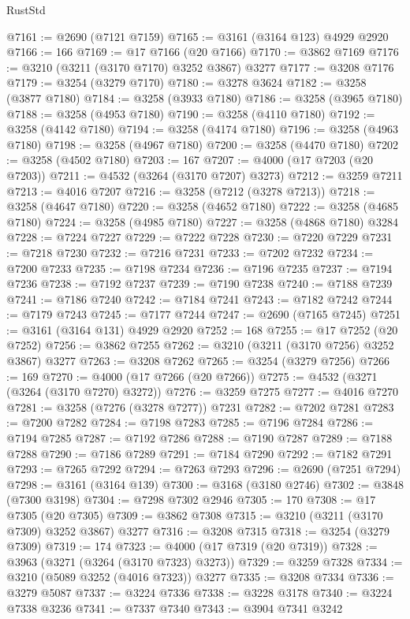 \begin{lexlean}{RustStd}
\begin{coremodule}
@7161 := @2690 (@7121 @7159)
@7165 := @3161 (@3164 @123) @4929 @2920
@7166 := 166
@7169 := @17 @7166 (@20 @7166)
@7170 := @3862 @7169
@7176 := @3210 (@3211 (@3170 @7170) @3252 @3867) @3277
@7177 := @3208 @7176
@7179 := @3254 (@3279 @7170)
@7180 := @3278 @3624
@7182 := @3258 (@3877 @7180)
@7184 := @3258 (@3933 @7180)
@7186 := @3258 (@3965 @7180)
@7188 := @3258 (@4953 @7180)
@7190 := @3258 (@4110 @7180)
@7192 := @3258 (@4142 @7180)
@7194 := @3258 (@4174 @7180)
@7196 := @3258 (@4963 @7180)
@7198 := @3258 (@4967 @7180)
@7200 := @3258 (@4470 @7180)
@7202 := @3258 (@4502 @7180)
@7203 := 167
@7207 := @4000 (@17 @7203 (@20 @7203))
@7211 := @4532 (@3264 (@3170 @7207) @3273)
@7212 := @3259 @7211
@7213 := @4016 @7207
@7216 := @3258 (@7212 (@3278 @7213))
@7218 := @3258 (@4647 @7180)
@7220 := @3258 (@4652 @7180)
@7222 := @3258 (@4685 @7180)
@7224 := @3258 (@4985 @7180)
@7227 := @3258 (@4868 @7180) @3284
@7228 := @7224 @7227
@7229 := @7222 @7228
@7230 := @7220 @7229
@7231 := @7218 @7230
@7232 := @7216 @7231
@7233 := @7202 @7232
@7234 := @7200 @7233
@7235 := @7198 @7234
@7236 := @7196 @7235
@7237 := @7194 @7236
@7238 := @7192 @7237
@7239 := @7190 @7238
@7240 := @7188 @7239
@7241 := @7186 @7240
@7242 := @7184 @7241
@7243 := @7182 @7242
@7244 := @7179 @7243
@7245 := @7177 @7244
@7247 := @2690 (@7165 @7245)
@7251 := @3161 (@3164 @131) @4929 @2920
@7252 := 168
@7255 := @17 @7252 (@20 @7252)
@7256 := @3862 @7255
@7262 := @3210 (@3211 (@3170 @7256) @3252 @3867) @3277
@7263 := @3208 @7262
@7265 := @3254 (@3279 @7256)
@7266 := 169
@7270 := @4000 (@17 @7266 (@20 @7266))
@7275 := @4532 (@3271 (@3264 (@3170 @7270) @3272))
@7276 := @3259 @7275
@7277 := @4016 @7270
@7281 := @3258 (@7276 (@3278 @7277)) @7231
@7282 := @7202 @7281
@7283 := @7200 @7282
@7284 := @7198 @7283
@7285 := @7196 @7284
@7286 := @7194 @7285
@7287 := @7192 @7286
@7288 := @7190 @7287
@7289 := @7188 @7288
@7290 := @7186 @7289
@7291 := @7184 @7290
@7292 := @7182 @7291
@7293 := @7265 @7292
@7294 := @7263 @7293
@7296 := @2690 (@7251 @7294)
@7298 := @3161 (@3164 @139)
@7300 := @3168 (@3180 @2746)
@7302 := @3848 (@7300 @3198)
@7304 := @7298 @7302 @2946
@7305 := 170
@7308 := @17 @7305 (@20 @7305)
@7309 := @3862 @7308
@7315 := @3210 (@3211 (@3170 @7309) @3252 @3867) @3277
@7316 := @3208 @7315
@7318 := @3254 (@3279 @7309)
@7319 := 174
@7323 := @4000 (@17 @7319 (@20 @7319))
@7328 := @3963 (@3271 (@3264 (@3170 @7323) @3273))
@7329 := @3259 @7328
@7334 := @3210 (@5089 @3252 (@4016 @7323)) @3277
@7335 := @3208 @7334
@7336 := @3279 @5087
@7337 := @3224 @7336
@7338 := @3228 @3178
@7340 := @3224 @7338 @3236
@7341 := @7337 @7340
@7343 := @3904 @7341 @3242

\end{coremodule}
\end{lexlean}

